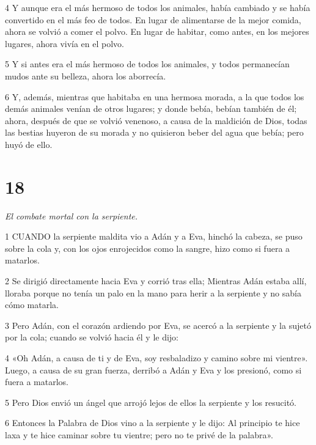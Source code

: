 \par 4 Y aunque era el más hermoso de todos los animales, había cambiado y se había convertido en el más feo de todos. En lugar de alimentarse de la mejor comida, ahora se volvió a comer el polvo. En lugar de habitar, como antes, en los mejores lugares, ahora vivía en el polvo.

\par 5 Y si antes era el más hermoso de todos los animales, y todos permanecían mudos ante su belleza, ahora los aborrecía.

\par 6 Y, además, mientras que habitaba en una hermosa morada, a la que todos los demás animales venían de otros lugares; y donde bebía, bebían también de él; ahora, después de que se volvió venenoso, a causa de la maldición de Dios, todas las bestias huyeron de su morada y no quisieron beber del agua que bebía; pero huyó de ello.

\chapter{18}

\par \textit{El combate mortal con la serpiente.}

\par 1 CUANDO la serpiente maldita vio a Adán y a Eva, hinchó la cabeza, se puso sobre la cola y, con los ojos enrojecidos como la sangre, hizo como si fuera a matarlos.

\par 2 Se dirigió directamente hacia Eva y corrió tras ella; Mientras Adán estaba allí, lloraba porque no tenía un palo en la mano para herir a la serpiente y no sabía cómo matarla.

\par 3 Pero Adán, con el corazón ardiendo por Eva, se acercó a la serpiente y la sujetó por la cola; cuando se volvió hacia él y le dijo:

\par 4 «Oh Adán, a causa de ti y de Eva, soy resbaladizo y camino sobre mi vientre». Luego, a causa de su gran fuerza, derribó a Adán y Eva y los presionó, como si fuera a matarlos.

\par 5 Pero Dios envió un ángel que arrojó lejos de ellos la serpiente y los resucitó.

\par 6 Entonces la Palabra de Dios vino a la serpiente y le dijo: Al principio te hice laxa y te hice caminar sobre tu vientre; pero no te privé de la palabra».

